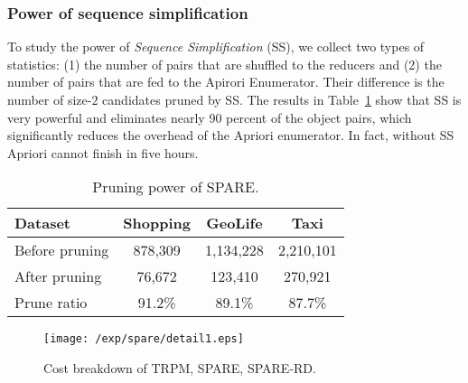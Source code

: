 \subsubsection{Power of sequence simplification}
To study the power of \emph{Sequence Simplification} (SS),
we collect two types of statistics: (1) the number of pairs that
are shuffled to the reducers and (2) the number of pairs that
are fed to the Apirori Enumerator. 
Their difference %
is the number of size-$2$ candidates pruned by SS.
The results in Table~\ref{tbl:pruning} show that %
SS is very powerful and eliminates nearly 90 percent of the object pairs, 
which significantly reduces the overhead of %
the Apriori enumerator.
In fact, without SS Apriori cannot
finish in five hours.



\begin{table}[h]
\centering
\begin{tabular}{|l|c|c|c|}
\hline 
\textbf{Dataset} & \textbf{Shopping} & \textbf{GeoLife} & \textbf{Taxi} \\ 
\hline 
Before pruning & 878,309 &  1,134,228 & 2,210,101 \\ 
\hline 
After pruning & 76,672 & 123,410 & 270,921 \\ 
\hline 
Prune ratio & 91.2\% & 89.1\% & 87.7\% \\ 
\hline 
\end{tabular} 
\vspace{-0,5em}
\caption{Pruning power of SPARE.}
\vspace{-0,5em}
\label{tbl:pruning}
\end{table}

\begin{figure}[h]
\centering
	  \texttt{[image: /exp/spare/detail1.eps]}
	 \vspace{-0.5em}
    \caption{Cost breakdown of TRPM, SPARE, SPARE-RD.}
   \vspace{-5mm}
    \label{exp:wl}
\end{figure}

